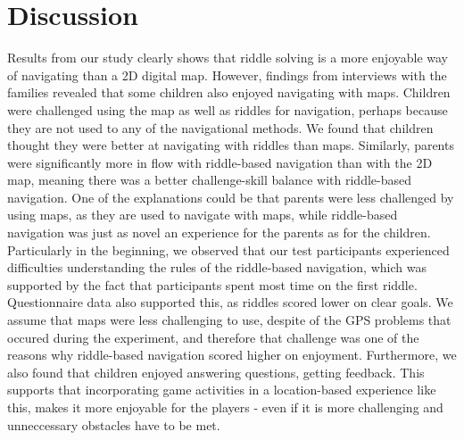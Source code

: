 \section{Discussion}
Results from our study clearly shows that riddle solving is a more enjoyable way of navigating than a 2D digital map. However, findings from interviews with the families revealed that some children also enjoyed navigating with maps. Children were challenged using the map as well as riddles for navigation, perhaps because they are not used to any of the navigational methods. We found that children thought they were better at navigating with riddles than maps. Similarly, parents were significantly more in flow with riddle-based navigation than with the 2D map, meaning there was a better challenge-skill balance with riddle-based navigation. One of the explanations could be that parents were less challenged by using maps, as they are used to navigate with maps, while riddle-based navigation was just as novel an experience for the parents as for the children. Particularly in the beginning, we observed that our test participants experienced difficulties understanding the rules of the riddle-based navigation, which was supported by the fact that participants spent most time on the first riddle. Questionnaire data also  supported this, as riddles scored lower on clear goals. We assume that maps were less challenging to use, despite of the GPS problems that occured during the experiment, and therefore that challenge was one of the reasons why riddle-based navigation scored higher on enjoyment. Furthermore, we also found that children enjoyed answering questions, getting feedback. This supports that incorporating game activities in a location-based experience like this, makes it more enjoyable for the players - even if it is more challenging and unneccessary obstacles have to be met. 


